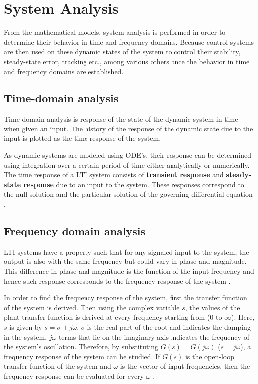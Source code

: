 \chapter{System Analysis}

From the mathematical models, system analysis is performed in order to determine their behavior in time and frequency domains. Because control systems are then used on these dynamic states of the system to control their stability, steady-state error, tracking etc., among various others once the behavior in time and frequency domains are established.

\section{Time-domain analysis}

Time-domain analysis is response of the state of the dynamic system in time when given an input. The history of the response of the dynamic state due to the input is plotted as the time-response of the system. 

As dynamic systems are modeled using ODE's, their response can be determined using integration over a certain period of time either analytically or numerically. The time response of a LTI system consists of \textbf{transient response} and \textbf{steady-state response} due to an input to the system. These responses correspond to the null solution and the particular solution of the governing differential equation \cite{CTMS2019_Analysis}.

\section{Frequency domain analysis}

LTI systems have a property such that for any signaled input to the system, the output is also with the same frequency but could vary in phase and magnitude. This difference in phase and magnitude is the function of the input frequency and hence such response corresponds to the frequency response of the system \cite{CTMS2019_Analysis}.

In order to find the frequency response of the system, first the transfer function of the system is derived. Then using the complex variable $s$, the values of the plant transfer function is derived at every frequency starting from ($0$ to $\infty$). Here, $s$ is given by $s = \sigma \pm j \omega$, $\sigma$ is the real part of the root and indicates the damping in the system, $j \omega$ terms that lie on the imaginary  axis indicates the frequency of the system's oscillation. Therefore, by substituting $G(s) = G(j \omega)$ ($s = j \omega$), a frequency response of the system can be studied. If $G(s)$ is the open-loop transfer function of the system and $\omega$ is the vector of input frequencies, then the frequency response can be evaluated for every $\omega$ \cite{CTMS2019_Analysis}.

